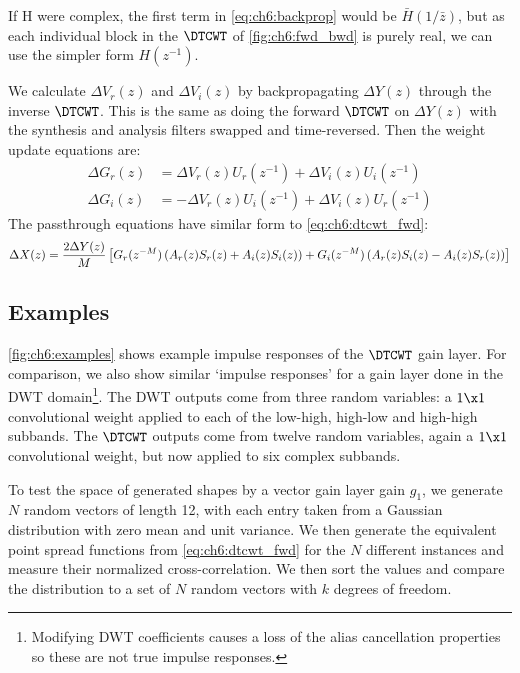 If H were complex, the first term in \autoref{eq:ch6:backprop} would be
$\bar{H}(1/\bar{z})$, but as each individual block in the $\DTCWT$ of
\autoref{fig:ch6:fwd_bwd} is purely real, we can use the simpler form $H(z^{-1})$. 

We calculate $\Delta V_r(z)$ and $\Delta V_i(z)$ by backpropagating
$\Delta Y(z)$ through the inverse $\DTCWT$. This is the same as doing the
forward $\DTCWT$ on $\Delta Y(z)$ with the synthesis and analysis filters
swapped and time-reversed. Then the weight update equations are:
\begin{align}
  \Delta G_r(z) &= \Delta V_r(z) U_r(z^{-1}) + \Delta V_i(z) U_i(z^{-1})  \label{eq:ch6:gr_update}\\
  \Delta G_i(z) &=  -\Delta V_r(z) U_i(z^{-1}) + \Delta V_i(z) U_r(z^{-1})  \label{eq:ch6:gi_update} 
\end{align}
%
The passthrough equations have similar form to \eqref{eq:ch6:dtcwt_fwd}:
\begin{equation}\label{eq:ch6:dtcwt_passthrough}
    \Delta X(z) = \frac{2\Delta Y(z)}{M} \left[G_r(z^{-M})\left( A_r(z)S_r(z) + A_i(z)S_i(z) \right) + \\
       G_i(z^{-M}) \left(A_r(z)S_i(z) - A_i(z)S_r(z) \right) \right] 
\end{equation}

\subsection{Examples}
\autoref{fig:ch6:examples} shows example impulse responses of the $\DTCWT$ gain
layer. For comparison, we also show similar `impulse responses' for a gain layer
done in the DWT domain\footnote{Modifying DWT coefficients causes a loss of the
alias cancellation properties so these are not true impulse responses.}. The DWT 
outputs come from three random variables: a $1\x 1$ 
convolutional weight applied to each of the low-high, high-low and high-high
subbands. The $\DTCWT$ outputs come from twelve random variables, again a $1\x
1$ convolutional weight, but now applied to six complex subbands. 

To test the space of generated shapes by a vector gain layer gain $g_1$, we
generate $N$ random vectors of length 12, with each entry taken
from a Gaussian distribution with zero mean and
unit variance. We then generate the equivalent point spread functions from
\eqref{eq:ch6:dtcwt_fwd} for the $N$ different instances and measure their 
normalized cross-correlation. We then sort the values and compare the
distribution to a set of $N$ random vectors with $k$ degrees of freedom. 

